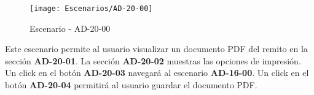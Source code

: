 \begin{figure}[H]
\centering
\texttt{[image: Escenarios/AD-20-00]}
\caption{Escenario - AD-20-00}
\label{fig:AD-20-00}
\end{figure}
Este escenario permite al usuario visualizar un documento PDF del remito en la sección \textbf{AD-20-01}. La sección \textbf{AD-20-02} muestras las opciones de impresión. Un click en el botón \textbf{AD-20-03} navegará al escenario \textbf{AD-16-00}. Un click en el botón \textbf{AD-20-04} permitirá al usuario guardar el documento PDF.
\clearpage
